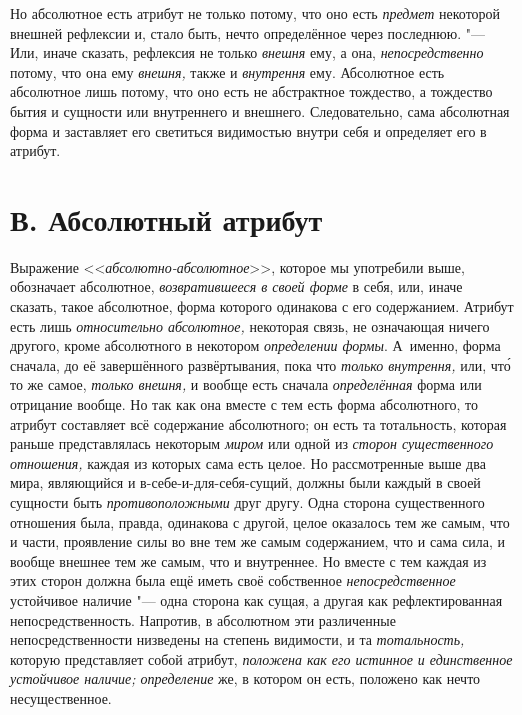 Но абсолютное есть атрибут не только потому, что оно есть
{\em предмет} некоторой внешней рефлексии и, стало
быть, нечто определённое через последнюю. "--- Или, иначе сказать, рефлексия
не только {\em внешня} ему, а она,
{\em непосредственно} потому, что она ему
{\em внешня,} также и
{\em внутрення} ему. Абсолютное есть абсолютное лишь
потому, что оно есть не абстрактное тождество, а тождество бытия и сущности
или внутреннего и внешнего. Следовательно, сама абсолютная форма и
заставляет его светиться видимостью внутри себя и определяет его в атрибут.


\section[В. Абсолютный атрибут]{В. Абсолютный атрибут}

Выражение <<{\em абсолютно-абсолютное}>>, которое мы употребили
выше, обозначает абсолютное, {\em возвратившееся в
своей форме} в себя, или, иначе сказать, такое абсолютное, форма которого
одинакова с его содержанием. Атрибут есть лишь
{\em относительно абсолютное,} некоторая связь, не
означающая ничего другого, кроме абсолютного в некотором
{\em определении формы}. А~именно, форма сначала, до её
завершённого развёртывания, пока что {\em только
внутрення,} или, чт\'{о} то же самое, {\em только внешня,}
и вообще есть сначала {\em определённая} форма или
отрицание вообще. Но так как она вместе с тем есть форма абсолютного, то
атрибут составляет всё содержание абсолютного; он есть та тотальность,
которая раньше представлялась некоторым {\em миром} или
одной из {\em сторон существенного отношения,} каждая
из которых сама есть целое. Но рассмотренные выше два мира, являющийся и
в-себе-и-для-себя-сущий, должны были каждый в своей сущности быть
{\em противоположными} друг другу. Одна сторона
существенного отношения была, правда, одинакова с другой, целое оказалось
тем же самым, что и части, проявление силы во вне тем же самым содержанием,
что и сама сила, и вообще внешнее тем же самым, что и внутреннее. Но вместе
с тем каждая из этих сторон должна была ещё иметь своё собственное
{\em непосредственное} устойчивое наличие "--- одна
сторона как сущая, а другая как рефлектированная непосредственность.
Напротив, в абсолютном эти различенные непосредственности низведены на
степень видимости, и та {\em тотальность,} которую
представляет собой атрибут, {\em положена как его
истинное и единственное устойчивое наличие; определение} же, в котором он
есть, положено как нечто несущественное.

